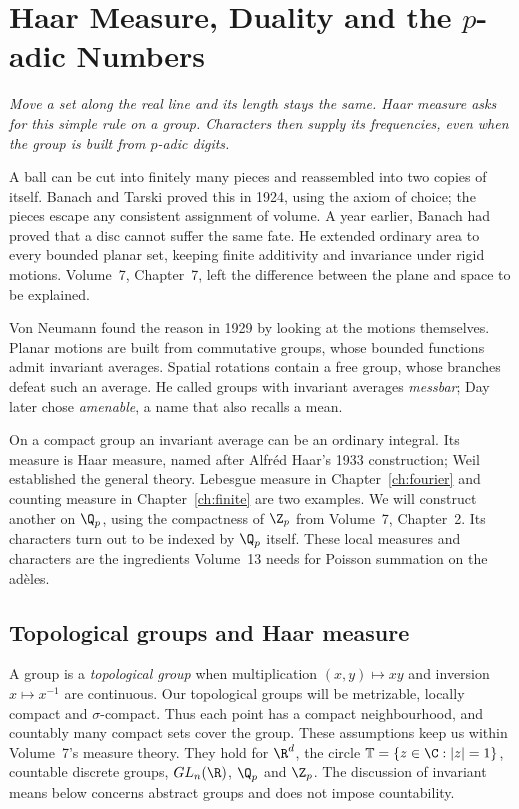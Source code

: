 \chapter{Haar Measure, Duality and the \texorpdfstring{$p$}{p}-adic Numbers}\label{ch:haar}

\begin{center}\itshape
Move a set along the real line and its length stays the same. Haar measure asks for this simple rule on a group. Characters then supply its frequencies, even when the group is built from $p$-adic digits.
\end{center}

A ball can be cut into finitely many pieces and reassembled into two copies of itself. Banach and Tarski proved this in 1924, using the axiom of choice; the pieces escape any consistent assignment of volume. A year earlier, Banach had proved that a disc cannot suffer the same fate. He extended ordinary area to every bounded planar set, keeping finite additivity and invariance under rigid motions. Volume~7, Chapter~7, left the difference between the plane and space to be explained.

Von Neumann found the reason in 1929 by looking at the motions themselves. Planar motions are built from commutative groups, whose bounded functions admit invariant averages. Spatial rotations contain a free group, whose branches defeat such an average. He called groups with invariant averages \emph{messbar}; Day later chose \emph{amenable}, a name that also recalls a mean.

On a compact group an invariant average can be an ordinary integral. Its measure is Haar measure, named after Alfr\'ed Haar's 1933 construction; Weil established the general theory. Lebesgue measure in Chapter~\ref{ch:fourier} and counting measure in Chapter~\ref{ch:finite} are two examples. We will construct another on $\Q_p$, using the compactness of $\Z_p$ from Volume~7, Chapter~2. Its characters turn out to be indexed by $\Q_p$ itself. These local measures and characters are the ingredients Volume~13 needs for Poisson summation on the adèles.


\section{Topological groups and Haar measure}

A group is a \emph{topological group} when multiplication $(x,y)\mapsto xy$ and inversion $x\mapsto x^{-1}$ are continuous. Our topological groups will be metrizable, locally compact and $\sigma$-compact. Thus each point has a compact neighbourhood, and countably many compact sets cover the group. These assumptions keep us within Volume~7's measure theory. They hold for $\R^d$, the circle $\mathbb T=\{z\in\C:|z|=1\}$, countable discrete groups, $GL_n(\R)$, $\Q_p$ and $\Z_p$. The discussion of invariant means below concerns abstract groups and does not impose countability.

